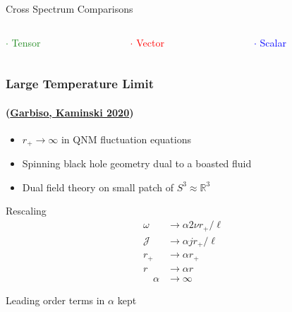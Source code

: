 \documentclass[xcolor=dvipsnames]{beamer}
\begin{document}
\begin{frame}{Cross Spectrum Comparisons}
  \vfill

  \begin{columns}[c]
    \begin{column}{0.33\textwidth}
      \textcolor{ForestGreen}{$\cdot$ Tensor}
    \end{column}

    \begin{column}{0.33\textwidth}
      \textcolor{red}{$\cdot$ Vector}
    \end{column}

    \begin{column}{0.33\textwidth}
      \textcolor{blue}{$\cdot$ Scalar}
    \end{column}
  \end{columns}
\end{frame}

\begin{frame}[squeeze]
  \frametitle{Large Temperature Limit}
  \framesubtitle{(\href{https://inspirehep.net/literature/1806001}{Garbiso, Kaminski 2020})}

  \begin{itemize}
    \item $r_+ \to \infty$ in QNM fluctuation equations
    \item Spinning black hole geometry dual to a boasted fluid
    \item Dual field theory on small patch of $S^3 \approx \mathbb{R}^3$
  \end{itemize}

  \begin{block}{Rescaling}
    \begin{equation*}
      \begin{aligned}
        \omega &\to \alpha 2\nu r_+/\ell \\
        \mathcal{J} &\to \alpha j r_+/\ell \\
        r_+ &\to \alpha r_+ \\
        r &\to \alpha r\\
        \quad \alpha&\to\infty
      \end{aligned}
    \end{equation*}
  \end{block}

  \begin{alertblock}{}
    Leading order terms in $\alpha$ kept
  \end{alertblock}

\end{frame}
\end{document}
